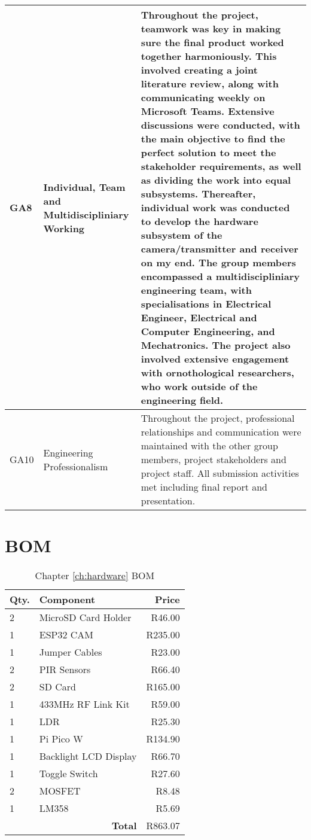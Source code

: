 \documentclass[class=report,11pt,crop=false]{standalone}
\begin{document}
\begin{tabularx}{\textwidth}{|p{} p{} X|}
    GA8 & Individual, Team and Multidiscipliniary Working & Throughout the project, teamwork was key in making sure the final product worked together harmoniously. This involved creating a joint literature review, along with communicating weekly on Microsoft Teams. Extensive discussions were conducted, with the main objective to find the perfect solution to meet the stakeholder requirements, as well as dividing the work into equal subsystems. Thereafter, individual work was conducted to develop the hardware subsystem of the camera/transmitter and receiver on my end. The group members encompassed a multidiscipliniary engineering team, with specialisations in Electrical Engineer, Electrical and Computer Engineering, and Mechatronics. The project also involved extensive engagement with ornothological researchers, who work outside of the engineering field. \\ \hline

    GA10 & Engineering Professionalism & Throughout the project, professional relationships and communication were maintained with the other group members, project stakeholders and project staff. All submission activities met including final report and presentation. \\ \hline


\end{tabularx}
\raggedright

\chapter{BOM}

\begin{table}[h]
\centering
\begin{tabular}{|l|l|r|}
\hline
\textbf{Qty.} & \textbf{Component} & \textbf{Price} \\
\hline
2 & MicroSD Card Holder & R46.00 \\
1 & ESP32 CAM & R235.00 \\
1 & Jumper Cables & R23.00 \\
2 & PIR Sensors & R66.40 \\
2 & SD Card & R165.00 \\
1 & 433MHz RF Link Kit & R59.00 \\
1 & LDR & R25.30 \\
1 & Pi Pico W & R134.90 \\
1 & Backlight LCD Display & R66.70 \\
1 & Toggle Switch & R27.60 \\
2 & MOSFET & R8.48 \\
1 & LM358 & R5.69 \\
\hline
\multicolumn{2}{|r|}{\textbf{Total}} & R863.07 \\
\hline
\end{tabular}
\caption{Chapter \ref{ch:hardware} BOM}
\label{tab:HW_BOM}
\end{table}


\ifstandalone

\printnoidxglossary[type=\acronymtype,nonumberlist]
\fi
\end{document}
